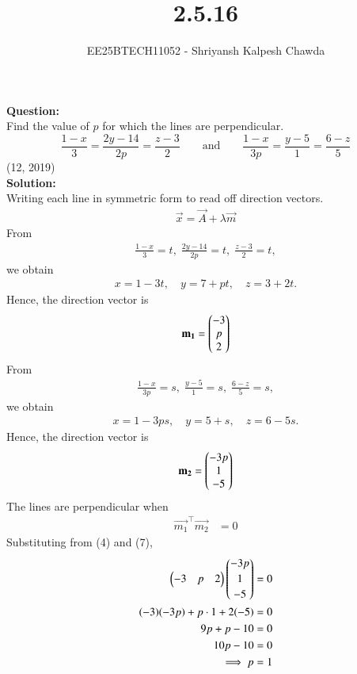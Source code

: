 \documentclass[journal]{IEEEtran}
\begin{document}
	
	
	\vspace{3cm}
	
	\title{2.5.16}
	\author{EE25BTECH11052 - Shriyansh Kalpesh Chawda}
	{\let\newpage\relax\maketitle}
	
	
	\renewcommand{\thefigure}{\arabic{figure}}
	\renewcommand{\thetable}{\arabic{table}}
	\renewcommand{\theequation}{\arabic{equation}}
	
	\textbf{Question:}\\
	Find the value of $p$ for which the lines are perpendicular.
	\[
	\frac{1-x}{3}=\frac{2y-14}{2p}=\frac{z-3}{2}
	\qquad\text{and}\qquad
	\frac{1-x}{3p}=\frac{y-5}{1}=\frac{6-z}{5}
	\]
	 \hfill (12, 2019)\\
\textbf{Solution:}\\
Writing each line in symmetric form to read off direction vectors.
		\begin{align}
	\vec{x} = \vec{A} + \lambda \vec{m}
		\end{align}
		From
	\begin{align}
	\frac{1-x}{3}=t,\;
	\frac{2y-14}{2p}=t,\;
	\frac{z-3}{2}=t,
	\end{align}
	we obtain
\begin{align}
	x = 1-3t,\quad
y = 7+pt,\quad
z = 3+2t.
\end{align}
Hence, the direction vector is
	\begin{align}
		\mathbf{m_1} = \begin{pmatrix}-3\\ p\\ 2\end{pmatrix}
	\end{align}
From
\begin{align}
	\frac{1-x}{3p}=s,\;
\frac{y-5}{1}=s,\;
\frac{6-z}{5}=s,
\end{align}
we obtain
	\begin{align}
			x = 1-3ps,\quad
		y = 5+s,\quad
		z = 6-5s.
	\end{align}
	Hence, the direction vector is
	\begin{align}
		\mathbf{m_2} = \begin{pmatrix}-3p\\ 1\\ -5\end{pmatrix}
	\end{align}
The lines are perpendicular when
	\begin{align}
		\vec{m_1}^\top \vec{m_2} &= 0
	\end{align}
	Substituting from (4) and (7),
	\begin{align}
		\begin{pmatrix}-3 & p & 2\end{pmatrix}\begin{pmatrix}-3p\\[2pt] 1\\[2pt] -5\end{pmatrix} &= 0 \\
		(-3)(-3p) + p\cdot 1 + 2(-5) &= 0 \\
		9p + p - 10 &= 0 \\
		10p - 10 &= 0 \\
		\Longrightarrow\; p &= 1
	\end{align}
\end{document}
